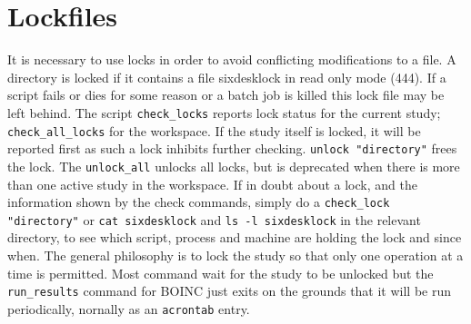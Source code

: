 \documentclass{article}    %
\begin{document}
\section{Lockfiles}
It is necessary to use locks in order to
avoid conflicting modifications to a file. A directory is locked if
it contains a file sixdesklock in read only mode (444).
If a script fails or dies for some reason or a batch job
is killed this lock file may be left behind. The script
{\tt check\_locks} reports lock status for the current study;
{\tt check\_all\_locks} for the workspace. If the study itself is
locked, it will be reported first as such a lock inhibits further
checking. 
{\tt unlock "directory"} frees the lock. The {\tt unlock\_all} 
unlocks all locks, but is deprecated when there is more than
one active study in the workspace. If in doubt about a lock, 
and the information shown by the check commands, simply do a 
{\tt check\_lock "directory"} or {\tt cat sixdesklock} and
{\tt ls -l sixdesklock} in the 
relevant directory, to see which script, process and machine are 
holding the lock and since when. The general philosophy is to lock
the study so that only one operation at a time is permitted. Most
command wait for the study to be unlocked but the {\tt run\_results}
command for BOINC just exits on the grounds that it will be run periodically,
nornally as an {\tt acrontab} entry.
 
\end{document}
